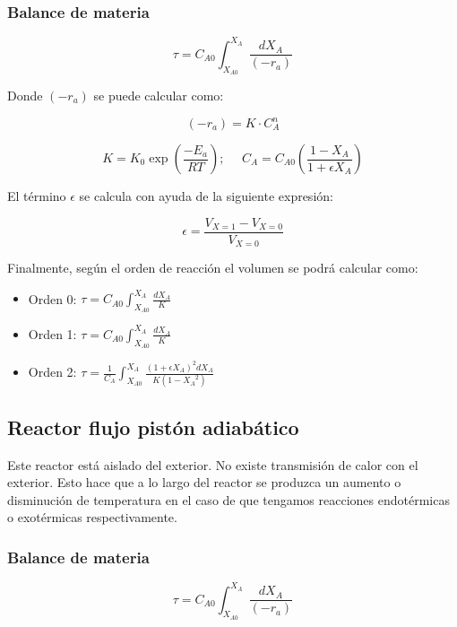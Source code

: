 \documentclass[20pt,a4paper]{extarticle}
\begin{document}
		\subsubsection{Balance de materia}
			\begin{equation*}
			\tau = C_{A0}\int_{X_{A0}}^{X_A}\frac{dX_A}{(-r_a)}
			\end{equation*}
			
			Donde $(-r_a)$ se puede calcular como:
			
			\begin{equation*}
			(-r_a) = K \cdot C_{A}^n
			\end{equation*}
			
			\begin{equation*}
			 K = K_0\exp\left(\frac{-E_a}{RT}\right);~~~~~~
			 C_{A} = C_{A0}(\frac{1 - X_A}{1 + \epsilon X_A})
			\end{equation*}
			
			El término $\epsilon$ se calcula con ayuda de la siguiente expresión:
			
			\begin{equation*}
			\epsilon = \frac{V_{X=1} - V_{X=0}}{V_{X=0}}
			\end{equation*}
			
			Finalmente, según el orden de reacción el volumen se podrá calcular como:
			
			\begin{itemize}
				\item Orden 0: $ \tau = C_{A0}\int_{X_{A0}}^{X_A}\frac{dX_A}K $
				
				\item Orden 1: $ \tau = C_{A0}\int_{X_{A0}}^{X_A}\frac{dX_A}K $
				
				\item Orden 2: $ \tau = \frac{1}{C_{A}}\int_{X_{A0}}^{X_A}\frac{(1+\epsilon X_A)^2dX_A}{K(1-{X_A}^2)} $
			
			\end{itemize}
		
		
		\subsection{Reactor flujo pistón adiabático}
		Este reactor está aislado del exterior. No existe transmisión de calor con el exterior. Esto hace que a lo largo del reactor se produzca un aumento o disminución de temperatura en el caso de que tengamos reacciones endotérmicas o exotérmicas respectivamente.
		
		\subsubsection{Balance de materia}
		\begin{equation*}
		\tau = C_{A0}\int_{X_{A0}}^{X_A}\frac{dX_A}{(-r_a)}
		\end{equation*}
		
\end{document}
